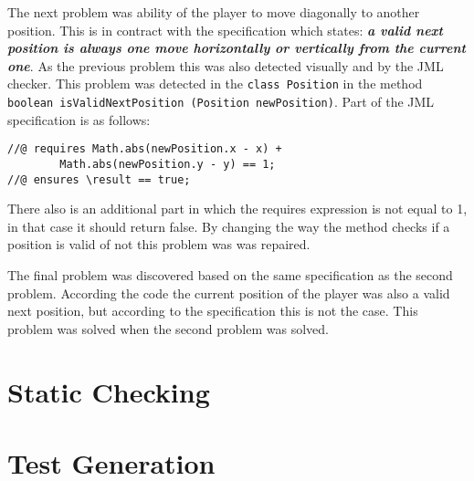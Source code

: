 \documentclass[a4paper]{article}
\begin{document}
The next problem was ability of the player to move diagonally to another position. This is in contract with the specification which states: \textbf{\textit{a valid next position is always one move horizontally or vertically from the current one}}. As the previous problem this was also detected visually and by the JML checker. This problem was detected in the \texttt{class Position} in the method \texttt{boolean isValidNextPosition (Position newPosition)}. Part of the JML specification is as follows:
\begin{lstlisting}
//@ requires Math.abs(newPosition.x - x) + 
		Math.abs(newPosition.y - y) == 1;
//@ ensures \result == true;
\end{lstlisting}
There also is an additional part in which the requires expression is not equal to 1, in that case it should return false. By changing the way the method checks if a position is valid of not this problem was was repaired.

The final problem was discovered based on the same specification as the second problem. According the code the current position of the player was also a valid next position, but according to the specification this is not the case. This problem was solved when the second problem was solved.

\section{Static Checking}


\section{Test Generation}
\end{document}
